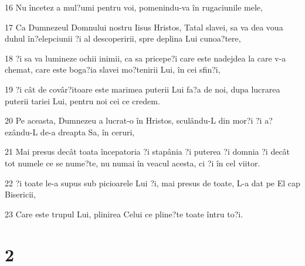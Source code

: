 \par 16 Nu încetez a mul?umi pentru voi, pomenindu-va în rugaciunile mele,
\par 17 Ca Dumnezeul Domnului nostru Iisus Hristos, Tatal slavei, sa va dea voua duhul în?elepciunii ?i al descoperirii, spre deplina Lui cunoa?tere,
\par 18 ?i sa va lumineze ochii inimii, ca sa pricepe?i care este nadejdea la care v-a chemat, care este boga?ia slavei mo?tenirii Lui, în cei sfin?i,
\par 19 ?i cât de covâr?itoare este marimea puterii Lui fa?a de noi, dupa lucrarea puterii tariei Lui, pentru noi cei ce credem.
\par 20 Pe aceasta, Dumnezeu a lucrat-o în Hristos, sculându-L din mor?i ?i a?ezându-L de-a dreapta Sa, în ceruri,
\par 21 Mai presus decât toata începatoria ?i stapânia ?i puterea ?i domnia ?i decât tot numele ce se nume?te, nu numai în veacul acesta, ci ?i în cel viitor.
\par 22 ?i toate le-a supus sub picioarele Lui ?i, mai presus de toate, L-a dat pe El cap Bisericii,
\par 23 Care este trupul Lui, plinirea Celui ce pline?te toate întru to?i.

\chapter{2}

